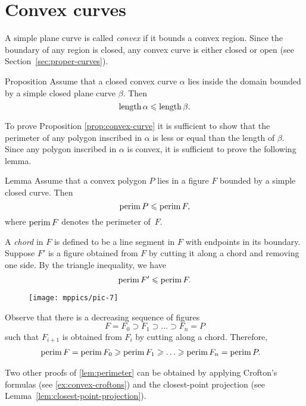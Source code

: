 \section{Convex curves}

A simple plane curve is called \emph{convex} if it bounds a convex region.
Since the boundary of any region is closed, any convex curve is either closed or open (see Section~\ref{sec:proper-curves}).

\begin{thm}{Proposition}\label{prop:convex-curve}
Assume that a closed convex curve $\alpha$ lies inside the domain bounded by a simple closed plane curve $\beta$.
Then
\[\mathop{\rm length}\nolimits\alpha\leqslant \mathop{\rm length}\nolimits\beta.\]
\end{thm}

To prove Proposition \ref{prop:convex-curve} it is sufficient to show that the perimeter of any polygon inscribed in $\alpha$ is less or equal than the length of $\beta$.
Since any polygon inscribed in $\alpha$ is convex, it is sufficient to prove the following lemma.

\begin{thm}{Lemma}\label{lem:perimeter}
Assume that a convex polygon $P$ lies in a figure $F$ bounded by a simple closed curve.
Then 
\[\mathop{\rm perim}\nolimits P\leqslant \mathop{\rm perim}\nolimits F,\]
where $\mathop{\rm perim}\nolimits F$ denotes the perimeter of~$F$.
\end{thm}

A \emph{chord} in $F$ is defined to be a line segment in $F$ with endpoints in its boundary.
Suppose $F'$ is a figure obtained from $F$ by cutting it along a chord and removing one side.
By the triangle inequality, we have
\[\mathop{\rm perim}\nolimits F'\leqslant \mathop{\rm perim}\nolimits F.\]

\begin{wrapfigure}{o}{24 mm}
\vskip-10mm
\centering
\texttt{[image: mppics/pic-7]}
\vskip3mm
\end{wrapfigure}

Observe that there is a decreasing sequence of figures 
\[F=F_0\supset F_1\supset\dots\supset F_n=P\]
such that $F_{i+1}$ is obtained from $F_{i}$ by cutting along a chord.
Therefore, 
\begin{align*}
\perim F=\perim F_0&\ge\perim F_1\ge\dots\ge\perim F_n=\perim P.
\end{align*}
\qedsf

Two other proofs of \ref{lem:perimeter} can be obtained by applying Crofton's formulas (see \ref{ex:convex-croftons}) and the closest-point projection (see Lemma~\ref{lem:closest-point-projection}).  

